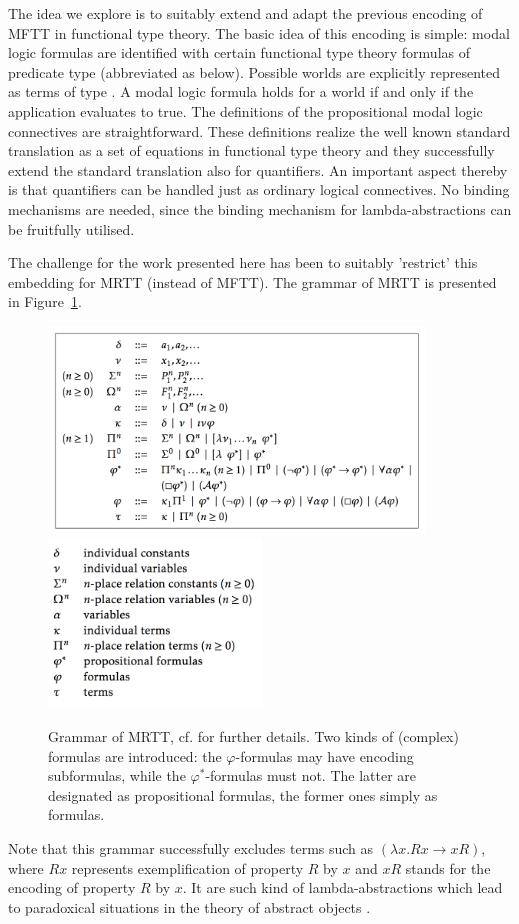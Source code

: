 \begin{isabellebody}
\begin{isamarkuptext}
  The idea we explore is to suitably extend and adapt the previous encoding of MFTT in functional type theory. 
  The basic idea of this encoding is simple: modal logic formulas are identified with certain functional 
  type theory formulas of predicate type  (abbreviated as  below). 
  Possible worlds are explicitly represented as
  terms of type  . A modal logic formula \isa{{\isasymphi}} holds for a world  if and 
  only if the application  evaluates to true. The definitions of the propositional modal logic 
  connectives are straightforward. These definitions realize the well known standard translation as a set of equations 
  in functional type theory and they successfully extend the standard translation also for quantifiers. An important
  aspect thereby is that quantifiers can be handled just as ordinary logical connectives. No binding mechanisms are needed,
  since the binding mechanism for lambda-abstractions can be fruitfully utilised.
  
  The challenge for the work presented here has been to suitably 'restrict' this embedding for MRTT (instead of MFTT).
  The grammar of MRTT is presented in Figure~\ref{mmrt}.
   \begin{figure}[t]
  \includegraphics[height=5.5cm]{ModalRelationalTypeTheory.png}\includegraphics[height=4.5cm]{ModalRelationalTypeTheory2.png}
  \caption{Grammar of MRTT, cf. \cite{zalta:_princ_metap} for further details. \label{mmrt}
  Two kinds of (complex) formulas are introduced: the $\varphi$-formulas may have encoding subformulas, while the
  $\varphi^*$-formulas must not. The latter are designated as propositional formulas, the former ones simply as formulas.}
  \end{figure}
  Note that this grammar successfully excludes terms such as $(\lambda x. Rx \rightarrow xR)$, where $Rx$ represents 
  exemplification of property $R$ by $x$ and $xR$ stands for the encoding of property $R$ by $x$. It are such kind of  
  lambda-abstractions which lead to paradoxical situations in the theory of abstract 
  objects \cite[chap.4]{zalta11:_relat_versus_funct_found_logic}.
  


\end{isamarkuptext}
\end{isabellebody}
